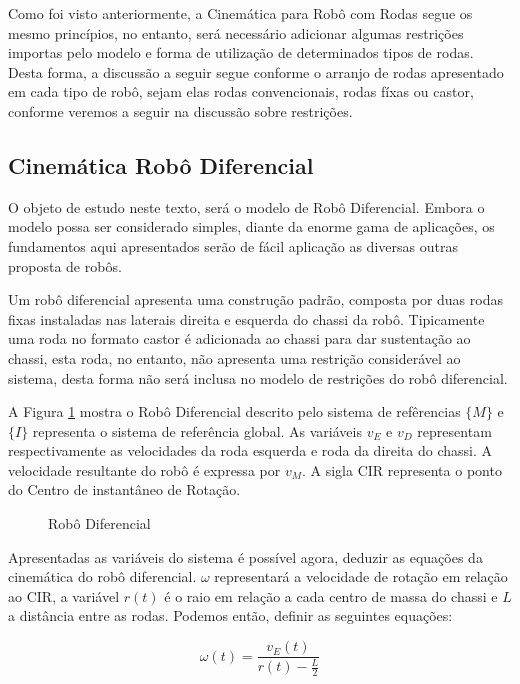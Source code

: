 Como foi visto anteriormente, a Cinemática para Robô com Rodas segue os mesmo princípios, no entanto, será necessário adicionar algumas restrições importas pelo modelo e forma de utilização de determinados tipos de rodas.
Desta forma, a discussão a seguir segue conforme o arranjo de rodas apresentado em cada tipo de robô, sejam elas rodas convencionais, rodas fíxas ou castor, conforme veremos a seguir na discussão sobre restrições.

\subsection{Cinemática Robô Diferencial}

O objeto de estudo neste texto, será o modelo de Robô Diferencial. Embora o modelo possa ser considerado simples, diante da enorme gama de aplicações, os fundamentos aqui apresentados serão de fácil aplicação as diversas outras proposta de robôs.

Um robô diferencial apresenta uma construção padrão, composta por duas rodas fixas instaladas nas laterais direita e esquerda do chassi da robô. Tipicamente uma roda no formato castor é adicionada ao chassi para dar sustentação ao chassi, esta roda, no entanto, 
não apresenta uma restrição considerável ao sistema, desta forma não será inclusa no modelo de restrições do robô diferencial.

A Figura \ref{fig:car01} mostra o Robô Diferencial descrito pelo sistema de refêrencias $\{M\}$ e $\{I\}$ representa o sistema de referência global.
As variáveis $v_{E}$ e $v_{D}$ representam respectivamente as velocidades da roda esquerda e roda da direita do chassi. A velocidade resultante do robô é expressa por $v_{M}$.
A sigla $\text{CIR}$ representa o ponto do Centro de instantâneo de Rotação. 
\begin{figure}[!ht]
    \centering
    
    \caption{Robô Diferencial}
    \label{fig:car01}
    \end{figure}

Apresentadas as variáveis do sistema é possível agora, deduzir as equações da cinemática do robô diferencial. $\omega$ representará a velocidade de rotação em relação ao $\text{CIR}$, a variável $r(t)$ é o raio em relação a cada centro de massa do chassi e $L$ a distância entre as rodas. Podemos então, definir as seguintes equações:

\begin{equation}
    \omega(t) = \frac{v_{E}(t)}{r(t) - \displaystyle\frac{L}{2}}
\end{equation}

